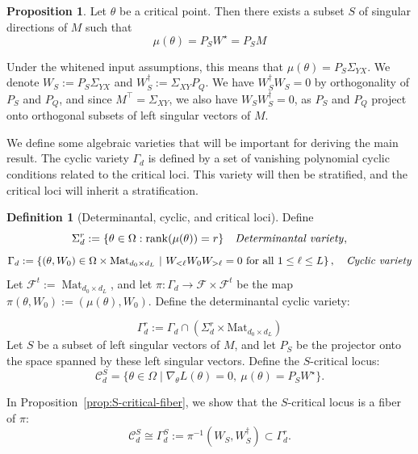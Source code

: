 \documentclass[11pt]{article}
\newcommand{\rk}{\operatorname{rank}}
\theoremstyle{definition}
\newtheorem{proposition}[theorem]{Proposition}
\newtheorem{definition}[theorem]{Definition}
\begin{document}
\begin{proposition}
  Let \(\theta\) be a critical point. Then there exists a subset \(S\) of singular directions of \(M\) such that
  \[
  \mu(\theta) = P_S W^{\star} = P_S M
  \]
\end{proposition}
Under the whitened input assumptions, this means that \(\mu(\theta)=P_S\Sigma_{YX}\). We denote \(W_S := P_S\Sigma_{YX}\) and \(W_S^{\dagger}:=\Sigma_{XY}P_Q\). We have \(W_S^{\dagger}W_S=0\) by orthogonality of \(P_S\) and \(P_Q\), and since \(M^{\top}=\Sigma_{XY}\), we also have \(W_S W_S^{\dagger}=0\), as \(P_S\) and \(P_Q\) project onto orthogonal subsets of left singular vectors of \(M\).

We define some algebraic varieties that will be important for deriving the main result. The cyclic variety \(\Gamma_d\) is defined by a set of vanishing polynomial cyclic conditions related to the critical loci. This variety will then be stratified, and the critical loci will inherit a stratification.
\begin{definition}[Determinantal, cyclic, and critical loci]
Define
\[
\Sigma_d^r:=\{\theta\in \Omega:\rk(\mu(\theta))=r\} \quad \text{\textit{Determinantal variety}},
\] 
\[
\Gamma_{d}
:=
\left\{
(\theta,W_0)\in \Omega \times \text{Mat}_{d_0 \times d_L}
\ \middle|\
W_{<\ell}W_{0}W_{>\ell}=0
\text{ for all }1\leq \ell\leq L
\right\}, \quad \text{\textit{Cyclic variety}}
\]
Let \(\mathcal{F}^t:=\operatorname{Mat}_{d_0\times d_L}\), and let \(\pi: \Gamma_d \to \mathcal{F} \times \mathcal{F}^t\) be the map \(\pi(\theta, W_0):= (\mu(\theta), W_0)\). Define the determinantal cyclic variety:

\[
\Gamma_{d}^r:=\Gamma_{d}\cap (\Sigma_d^r \times \text{Mat}_{d_0 \times d_L})
\]
Let \(S\) be a subset of left singular vectors of \(M\), and let \(P_S\) be the projector onto the space spanned by these left singular vectors. Define the \(S\)-critical locus:
\[
\mathcal C^S_{d} = \{\theta\in\Omega \mid \nabla_{\theta} L(\theta)=0,\ \mu(\theta)=P_S W^{\star}\}.
\]
\end{definition}
In Proposition~\ref{prop:S-critical-fiber}, we show that the \(S\)-critical locus is a fiber of \(\pi\):
\[
\mathcal C^S_{d} \cong \Gamma^S_d:=\pi^{-1}(W_S, W_S^{\dagger}) \subset \Gamma^r_d.
\]
\end{document}
